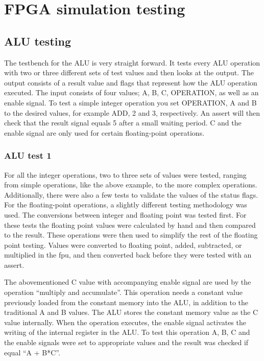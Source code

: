\section{FPGA simulation testing}\label{section:fpga-simulation-testing}


\subsection{ALU testing}

The testbench for the ALU is very straight forward. It tests every ALU operation
with two or three different sets of test values and then looks at the output.
The output consists of a result value and flags that represent how the ALU
operation executed. The input consists of four values; A, B, C, OPERATION, as
well as an enable signal. To test a simple integer operation you set OPERATION,
A and B to the desired values, for example ADD, 2 and 3, respectively. An assert
will then check that the result signal equals 5 after a small waiting period. C
and the enable signal are only used for certain floating-point operations.

\subsubsection{ALU test 1}

For all the integer operations, two to three sets of values were tested, ranging
from simple operations, like the above example, to the more complex operations.
Additionally, there were also a few tests to validate the values of the status flags. For the floating-point
operations, a slightly different testing methodology was used. The conversions
between integer and floating point was tested first. For these tests the
floating point values were calculated by hand and then compared to the result.
These operations were then used to simplify the rest of the floating point
testing. Values were converted to floating point, added, subtracted, or
multiplied in the fpu, and then converted back before they were tested with an
assert.

The abovementioned C value with accompanying enable signal are used by the
operation ``multiply and accumulate''. This operation needs a constant value
previously loaded from the constant memory into the ALU, in addition to the
traditional A and B values. The ALU stores the constant memory value as the C
value internally. When the operation executes, the enable signal activates the
writing of the internal register in the ALU. To test this operation A, B, C and
the enable signals were set to appropriate values and the result was checked if
equal ``A + B*C''.

